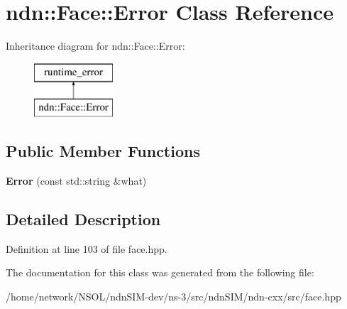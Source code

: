 \hypertarget{classndn_1_1Face_1_1Error}{}\section{ndn\+:\+:Face\+:\+:Error Class Reference}
\label{classndn_1_1Face_1_1Error}
Inheritance diagram for ndn\+:\+:Face\+:\+:Error\+:\begin{figure}[H]
\begin{center}
\leavevmode
\includegraphics[height=2.000000cm]{classndn_1_1Face_1_1Error}
\end{center}
\end{figure}
\subsection*{Public Member Functions}
\begin{DoxyCompactItemize}
\item 
{\bfseries Error} (const std\+::string \&what)\hypertarget{classndn_1_1Face_1_1Error_a3bf0118a8fbe4945bcebceaa9af0fd23}{}\label{classndn_1_1Face_1_1Error_a3bf0118a8fbe4945bcebceaa9af0fd23}

\end{DoxyCompactItemize}


\subsection{Detailed Description}


Definition at line 103 of file face.\+hpp.



The documentation for this class was generated from the following file\+:\begin{DoxyCompactItemize}
\item 
/home/network/\+N\+S\+O\+L/ndn\+S\+I\+M-\/dev/ns-\/3/src/ndn\+S\+I\+M/ndn-\/cxx/src/face.\+hpp\end{DoxyCompactItemize}
